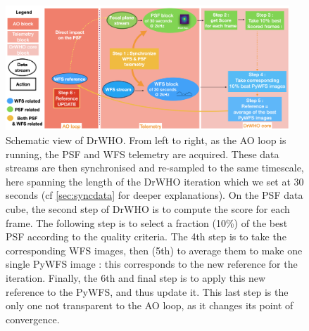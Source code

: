 \documentclass[twocolumn]{aa}
\begin{document}

\begin{figure}[t]
\begin{center}
\centering
\includegraphics[width=0.95\textwidth]{fig/DrWHOschematicview.png}
\caption{Schematic view of DrWHO. From left to right, as the AO loop is running, the PSF and WFS telemetry are acquired. These data streams are then synchronised and re-sampled to the same timescale, here spanning the length of the DrWHO iteration which we set at 30 seconds (cf \ref{sec:syncdata} for deeper explanations). On the PSF data cube, the second step of DrWHO is to compute the score for each frame. The following step is to select a fraction (10\%) of the best PSF according to the quality criteria. The 4th step is to take the corresponding WFS images, then (5th) to average them to make one single PyWFS image : this corresponds to the new reference for the iteration. Finally, the 6th and final step is to apply this new reference to the PyWFS, and thus update it. This last step is the only one not transparent to the AO loop, as it changes its point of convergence.}
\label{fig:DrWHOschema}
\end{center}
\end{figure}

\end{document}
